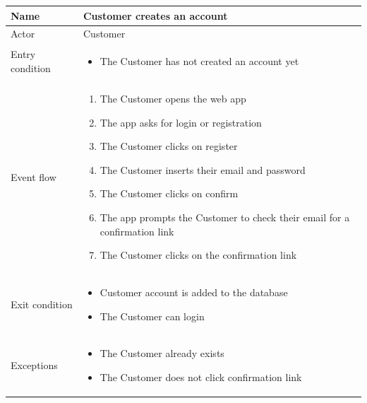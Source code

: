 \begin{table}[H]
    \begin{tabu} to \textwidth {|X|X[4]|}
        \hline
        Name            & Customer creates an account \\ \hline
        Actor           & Customer                    \\ \hline
        Entry condition & \begin{itemize}
            \item The Customer has not created an account yet
        \end{itemize}  \\ \hline
        Event flow      & \begin{enumerate}
            \item The Customer opens the web app
            \item The app asks for login or registration
            \item The Customer clicks on register
            \item The Customer inserts their email and password
            \item The Customer clicks on confirm
            \item The app prompts the Customer to check their email for a confirmation link
            \item The Customer clicks on the confirmation link
        \end{enumerate}  \\ \hline
        Exit condition  & \begin{itemize}
            \item Customer account is added to the database
            \item The Customer can login
        \end{itemize}  \\ \hline
        Exceptions      & \begin{itemize}
            \item The Customer already exists
            \item The Customer does not click confirmation link
        \end{itemize}  \\ \hline
    \end{tabu}
\end{table}

